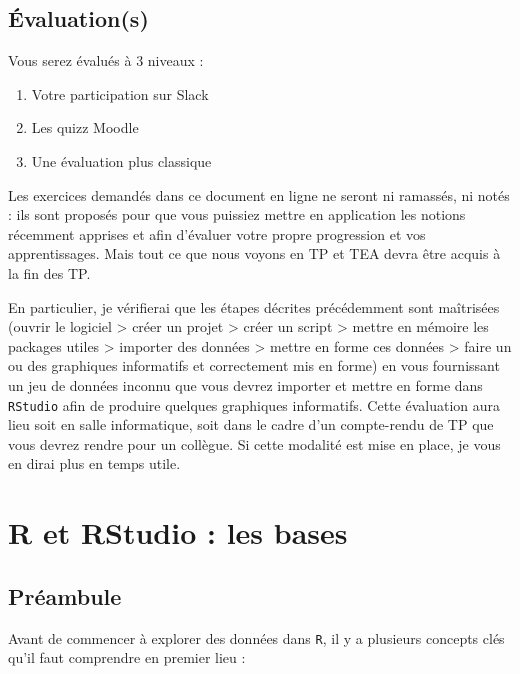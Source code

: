 \documentclass[
  letterpaper,
  DIV=11,
  numbers=noendperiod]{scrreprt}
\providecommand{\tightlist}{%
  \setlength{\itemsep}{0pt}\setlength{\parskip}{0pt}}\usepackage{longtable,booktabs,array}
\begin{document}
\hypertarget{uxe9valuations}{%
\section*{Évaluation(s)}\label{uxe9valuations}}

Vous serez évalués à 3 niveaux :

\begin{enumerate}
\def\labelenumi{\arabic{enumi}.}
\tightlist
\item
  Votre participation sur Slack
\item
  Les quizz Moodle
\item
  Une évaluation plus classique
\end{enumerate}

Les exercices demandés dans ce document en ligne ne seront ni ramassés,
ni notés : ils sont proposés pour que vous puissiez mettre en
application les notions récemment apprises et afin d'évaluer votre
propre progression et vos apprentissages. Mais tout ce que nous voyons
en TP et TEA devra être acquis à la fin des TP.

En particulier, je vérifierai que les étapes décrites précédemment sont
maîtrisées (ouvrir le logiciel \textgreater{} créer un projet
\textgreater{} créer un script \textgreater{} mettre en mémoire les
packages utiles \textgreater{} importer des données \textgreater{}
mettre en forme ces données \textgreater{} faire un ou des graphiques
informatifs et correctement mis en forme) en vous fournissant un jeu de
données inconnu que vous devrez importer et mettre en forme dans
\texttt{RStudio} afin de produire quelques graphiques informatifs. Cette
évaluation aura lieu soit en salle informatique, soit dans le cadre d'un
compte-rendu de TP que vous devrez rendre pour un collègue. Si cette
modalité est mise en place, je vous en dirai plus en temps utile.


\hypertarget{sec-bases}{%
\chapter{R et RStudio : les bases}\label{sec-bases}}

\hypertarget{pruxe9ambule}{%
\section{Préambule}\label{pruxe9ambule}}

Avant de commencer à explorer des données dans \texttt{R}, il y a
plusieurs concepts clés qu'il faut comprendre en premier lieu :
\end{document}

